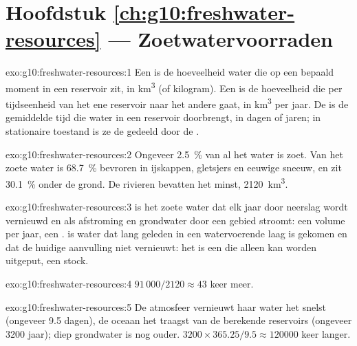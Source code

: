 \section*{Hoofdstuk \ref{ch:g10:freshwater-resources} --- Zoetwatervoorraden}

\begin{solution}{exo:g10:freshwater-resources:1}
Een  is de hoeveelheid water die op een bepaald moment in een reservoir
zit, in \unit{km^3} (of kilogram). Een  is de hoeveelheid die per
tijdseenheid van het ene reservoir naar het andere gaat, in \unit{km^3} per jaar.
De  is de gemiddelde tijd die water in een reservoir doorbrengt, in
dagen of jaren; in stationaire toestand is ze de  gedeeld door de .
\end{solution}

\begin{solution}{exo:g10:freshwater-resources:2}
Ongeveer \qty{2.5}{\percent} van al het water is zoet. Van het zoete water is
\qty{68.7}{\percent} bevroren in ijskappen, gletsjers en eeuwige sneeuw, en zit
\qty{30.1}{\percent} onder de grond. De rivieren bevatten het minst,
\num{2120}~\unit{km^3}.
\end{solution}

\begin{solution}{exo:g10:freshwater-resources:3}
 is het zoete water dat elk jaar door neerslag wordt
vernieuwd en als afstroming en grondwater door een gebied stroomt: een volume per
jaar, een .  is water dat lang geleden in een watervoerende
laag is gekomen en dat de huidige aanvulling niet vernieuwt: het is een 
die alleen kan worden uitgeput, een stock.
\end{solution}

\begin{solution}{exo:g10:freshwater-resources:4}
$91\,000/2120 \approx 43$ keer meer.
\end{solution}

\begin{solution}{exo:g10:freshwater-resources:5}
De atmosfeer vernieuwt haar water het snelst (ongeveer \num{9.5} dagen), de
oceaan het traagst van de berekende reservoirs (ongeveer \num{3200} jaar); diep
grondwater is nog ouder. $3200 \times 365.25/9.5 \approx \num{120000}$
keer langer.
\end{solution}

